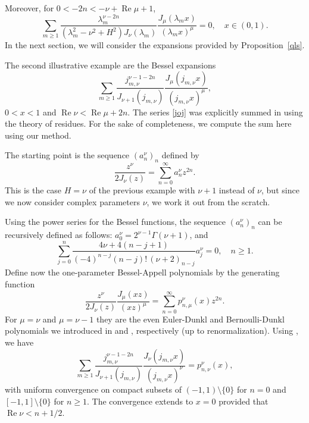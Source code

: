 \documentclass[12pt,leqno]{amsart}
\numberwithin{equation}{section}
\theoremstyle{plain}
\renewcommand{\Re}{\operatorname{Re}}
\begin{document}
Moreover, for $0<-2n<-\nu+\Re \mu+1$,
\begin{equation*}
\sum_{m\ge 1} \frac{\lambda_m^{\nu-2n}}{(\lambda_m^2-\nu^2+H^2)J_\nu(\lambda_m)}
\frac{J_{\mu}(\lambda_m x)}{(\lambda_m x)^\mu}=0, \quad x\in (0,1).
\end{equation*}
In the next section, we will consider the expansions provided by Proposition~\ref{qls}.

The second illustrative example are the Bessel expansions
\begin{equation}
\label{joj}
\sum_{m\ge 1} \frac{j_{m,\nu}^{\nu-1-2n}}{J_{\nu+1}(j_{m,\nu})}
\frac{J_{\mu}(j_{m,\nu}x)}{(j_{m,\nu}x)^{\mu}},
\end{equation}
$0<x<1$ and $\Re \nu<\Re \mu+2n$. The series \eqref{joj} was explicitly summed in \cite[Sect.~5]{DPV3} using the theory of residues. For the sake of completeness, we compute the sum here using our method.

The starting point is the sequence $(a_n^{\nu})_n$ defined by
\begin{equation}
\label{snfg}
\frac{z^\nu}{2J_{\nu}(z)} = \sum_{n=0}^\infty a_n^{\nu}z^{2n}.
\end{equation}
This is the case $H=\nu$ of the previous example with $\nu+1$ instead of $\nu$, but since we now consider complex parameters $\nu$, we work it out from the scratch.

Using the power series for the Bessel functions, the sequence $(a_n^{\nu})_n$ can be recursively defined as follows: $a_0^{\nu}=2^{\nu-1}\Gamma(\nu+1)$, and
\begin{equation}
\label{snrd}
\sum_{j=0}^n \frac{4\nu+4(n-j+1)}{(-4)^{n-j}(n-j)!\,(\nu+2)_{n-j}}a_j^{\nu}=0,
\quad n\ge 1.
\end{equation}
Define now the one-parameter Bessel-Appell polynomials by the generating function
\begin{equation}
\label{dirdv}
\frac{z^\nu}{2J_{\nu}(z)}
\frac{J_\mu(xz)}{(xz)^\mu} = \sum_{n=0}^\infty p_{n,\mu}^{\nu}(x)z^{2n}.
\end{equation}
For $\mu=\nu$ and $\mu=\nu-1$ they are the even Euler-Dunkl and Bernoulli-Dunkl polynomials we introduced in \cite{DPV} and \cite{CDPV}, respectively (up to renormalization).
Using \cite[Theorem~3.1]{DPV}, we have
\begin{equation}
\label{joj1}
\sum_{m\ge 1} \frac{j_{m,\nu}^{\nu-1-2n}}{J_{\nu+1}(j_{m,\nu})}
\frac{J_{\nu}(j_{m,\nu}x)}{(j_{m,\nu}x)^{\nu}} 
= p_{n,\nu}^{\nu}(x),
\end{equation}
with uniform convergence on compact subsets of $(-1,1)\setminus\{0\}$ for $n=0$ and $[-1,1]\setminus \{0\}$ for $n\ge 1$. The convergence extends to $x=0$ provided that $\Re \nu<n+1/2$.
\end{document}
